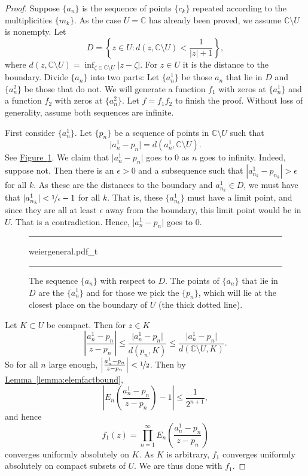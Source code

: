 \documentclass[12pt,openany]{book}
\newcommand{\sabs}[1]{\lvert {#1} \rvert}
\newcommand{\abs}[1]{\left\lvert {#1} \right\rvert}
\newcommand{\C}{{\mathbb{C}}}
\theoremstyle{plain}
\theoremstyle{remark}
\theoremstyle{definition}
\newenvironment{myfig}{%
\begin{figure}[h!t]
\noindent\rule{\textwidth}{0.5pt}\vspace{12pt}\par\centering}%
{\par\noindent\rule{\textwidth}{0.5pt}
\end{figure}}
\theoremstyle{exercise}
\theoremstyle{example}
\newcommand{\figureref}[1]{\hyperref[#1]{Figure~\ref*{#1}}}
\newcommand{\lemmaref}[1]{\hyperref[#1]{Lemma~\ref*{#1}}}
\begin{document}
\begin{proof}
Suppose $\{ a_n \}$ is the sequence of points $\{ c_k \}$ repeated
according to the multiplicities $\{ m_k \}$.
As the case $U=\C$ has already been proved, we assume $\C \setminus
U$ is nonempty.
Let
\begin{equation*}
D = \left\{ z \in U :
d(z,\C \setminus U) < \frac{1}{\sabs{z}+1}
\right\} ,
\end{equation*}
where $d(z,\C\setminus U) = \inf_{\zeta \in \C \setminus U}
\sabs{z-\zeta}$.  For $z \in U$ it is the distance to the boundary.
Divide $\{ a_n \}$ into two parts:
Let $\{ a^1_n \}$ be those $a_n$ that lie in $D$ and $\{ a^2_n \}$
be those that do not.
We will generate a function $f_1$ with zeros at $\{ a^1_n \}$ and
a function $f_2$ with zeros at $\{ a^2_n \}$.  Let $f = f_1 f_2$
to finish the proof.
Without loss of generality, assume both sequences are infinite.

First consider $\{ a^1_n \}$.  Let $\{ p_n \}$ be a sequence of points in
$\C \setminus U$ such
that
\begin{equation*}
\sabs{a^1_n-p_n} = d(a^1_n,\C \setminus U).
\end{equation*}
See \figureref{fig:weiergeneral}.
We claim that 
$\sabs{a^1_n-p_n}$ goes to $0$ as $n$ goes to infinity.
Indeed, suppose not.  Then there is an $\epsilon > 0$ and
a subsequence such that 
$\abs{a^1_{n_k}-p_{n_k}} > \epsilon$ for all $k$.  As these are the
distances to the boundary and $a^1_{n_k} \in D$,
we must have that $\sabs{a^1_{n_k}} < \nicefrac{1}{\epsilon}-1$ for all $k$.
That is, these $\{ a^1_{n_k} \}$ must have a limit point, and since they
are all at least $\epsilon$ away from the boundary, this limit point would be
in $U$.  That is a contradiction.  Hence,
$\sabs{a^1_n-p_n}$ goes to $0$.

\begin{myfig}
{weiergeneral.pdf_t}
\caption{The sequence $\{ a_n \}$ with respect to $D$.  The 
points of $\{ a_n \}$ that lie in $D$ are the $\{ a^1_n \}$ and for those we
pick the $\{ p_n \}$, which will lie at the closest place on the boundary of
$U$ (the thick dotted line).\label{fig:weiergeneral}}
\end{myfig}

Let $K \subset U$ be compact.  Then for $z \in K$
\begin{equation*}
\abs{\frac{a^1_n-p_n}{z-p_n}}
\leq
\frac{\sabs{a^1_n-p_n}}{d(p_n,K)}
\leq
\frac{\sabs{a^1_n-p_n}}{d(\C \setminus U,K)} .
\end{equation*}
So for all $n$ large enough,
$\abs{\frac{a^1_n-p_n}{z-p_n}} < \nicefrac{1}{2}$.
Then by \lemmaref{lemma:elemfactbound},
\begin{equation*}
\abs{E_n\left(
\frac{a^1_n-p_n}{z-p_n}
\right)-1} \leq \frac{1}{2^{n+1}} ,
\end{equation*}
and hence
\begin{equation*}
f_1(z)
=
\prod_{n=1}^\infty
E_n\left(
\frac{a^1_n-p_n}{z-p_n}
\right)
\end{equation*}
converges uniformly absolutely on $K$.  As $K$ is arbitrary, $f_1$ converges
uniformly absolutely on compact subsets of $U$.  We are thus done with $f_1$.


\end{proof}
\end{document}
